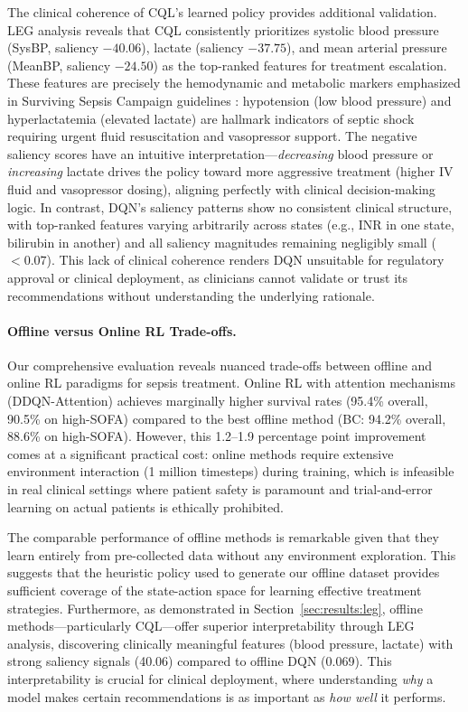 The clinical coherence of CQL's learned policy provides additional validation. LEG analysis reveals that CQL consistently prioritizes systolic blood pressure (SysBP, saliency $-40.06$), lactate (saliency $-37.75$), and mean arterial pressure (MeanBP, saliency $-24.50$) as the top-ranked features for treatment escalation. These features are precisely the hemodynamic and metabolic markers emphasized in Surviving Sepsis Campaign guidelines \citep{rhodes2017ssc}: hypotension (low blood pressure) and hyperlactatemia (elevated lactate) are hallmark indicators of septic shock requiring urgent fluid resuscitation and vasopressor support. The negative saliency scores have an intuitive interpretation—\textit{decreasing} blood pressure or \textit{increasing} lactate drives the policy toward more aggressive treatment (higher IV fluid and vasopressor dosing), aligning perfectly with clinical decision-making logic. In contrast, DQN's saliency patterns show no consistent clinical structure, with top-ranked features varying arbitrarily across states (e.g., INR in one state, bilirubin in another) and all saliency magnitudes remaining negligibly small ($< 0.07$). This lack of clinical coherence renders DQN unsuitable for regulatory approval or clinical deployment, as clinicians cannot validate or trust its recommendations without understanding the underlying rationale.

\paragraph{Offline versus Online RL Trade-offs.}
Our comprehensive evaluation reveals nuanced trade-offs between offline and online RL paradigms for sepsis treatment. Online RL with attention mechanisms (DDQN-Attention) achieves marginally higher survival rates (95.4\% overall, 90.5\% on high-SOFA) compared to the best offline method (BC: 94.2\% overall, 88.6\% on high-SOFA). However, this 1.2--1.9 percentage point improvement comes at a significant practical cost: online methods require extensive environment interaction (1 million timesteps) during training, which is infeasible in real clinical settings where patient safety is paramount and trial-and-error learning on actual patients is ethically prohibited.

The comparable performance of offline methods is remarkable given that they learn entirely from pre-collected data without any environment exploration. This suggests that the heuristic policy used to generate our offline dataset provides sufficient coverage of the state-action space for learning effective treatment strategies. Furthermore, as demonstrated in Section~\ref{sec:results:leg}, offline methods—particularly CQL—offer superior interpretability through LEG analysis, discovering clinically meaningful features (blood pressure, lactate) with strong saliency signals (40.06) compared to offline DQN (0.069). This interpretability is crucial for clinical deployment, where understanding \textit{why} a model makes certain recommendations is as important as \textit{how well} it performs.

